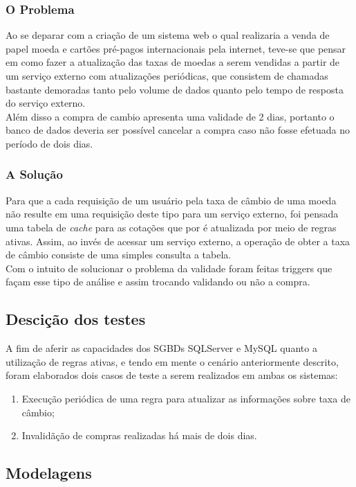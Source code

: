 \documentclass[conference]{IEEEtran}
\begin{document}
    \subsubsection{O Problema} Ao se deparar com a criação de um sistema web o qual realizaria a venda de papel moeda e cartões pré-pagos internacionais pela internet, teve-se que pensar em como fazer a atualização das taxas de moedas a serem vendidas a partir de um serviço externo com atualizações periódicas, que consistem de chamadas bastante demoradas tanto pelo volume de dados quanto pelo tempo de resposta do serviço externo.\\
    Além disso a compra de cambio apresenta uma validade de 2 dias, portanto o banco de dados deveria ser possível cancelar a compra caso não fosse efetuada no período de dois dias.

    \subsubsection{A Solução} Para que a cada requisição de um usuário pela taxa de câmbio de uma moeda não resulte em uma requisição deste tipo para um serviço externo, foi pensada uma tabela de \textit{cache} para as cotações que por é atualizada por meio de regras ativas. Assim, ao invés de acessar um serviço externo, a operação de obter a taxa de câmbio consiste de uma simples consulta a tabela.\\
    Com o intuito de solucionar o problema da validade foram feitas triggers que façam esse tipo de análise e assim trocando validando ou não a compra.

  \subsection{Descição dos testes}
  A fim de aferir as capacidades dos SGBDs SQLServer e MySQL quanto a utilização de regras ativas, e tendo em mente o cenário anteriormente descrito, foram elaborados dois casos de teste a serem realizados em ambas os sistemas:

  \begin{enumerate}
    \item Execução periódica de uma regra para atualizar as informações sobre taxa de câmbio;
    \item Invalidãção de compras realizadas há mais de dois dias.
  \end{enumerate}

  \subsection{Modelagens}
\end{document}
